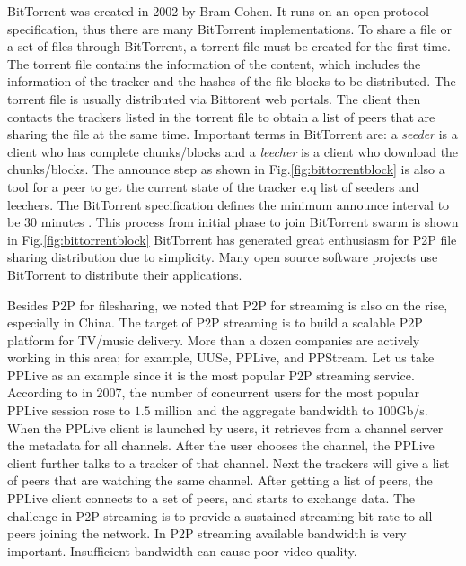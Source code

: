 BitTorrent was created in 2002 by Bram Cohen. 
It runs on an open protocol specification, thus there are many BitTorrent implementations.
To share a file or a set of files through BitTorrent, a torrent file must be created for the first time.  
The torrent file contains the information of the content, which includes the information of the tracker and the hashes of the file blocks to be distributed.
The torrent file is usually distributed via Bittorent web portals.
The client then contacts the trackers listed in the torrent file to obtain a list of peers that are sharing the file at the same time.  
Important terms in BitTorrent are: a \textit{seeder} is a client who has complete chunks/blocks and a \textit{leecher} is a client who download the chunks/blocks.
The announce step as shown in Fig.\ref{fig:bittorrentblock} is also a tool for a peer to get the current state of the tracker e.q list of seeders and leechers.
The BitTorrent specification defines the minimum announce interval to be 30 minutes \cite{torrentspec}.
This process from initial phase to join BitTorrent swarm is shown in Fig.\ref{fig:bittorrentblock}
BitTorrent has generated great enthusiasm for P2P file sharing distribution due to simplicity.  
Many open source software projects use BitTorrent to distribute their applications.

Besides P2P for filesharing, we  noted that P2P for streaming is also on the rise, especially in China.
The target of P2P streaming is to build a scalable P2P platform for TV/music delivery. 
More than a dozen companies are actively working in this area; for example, UUSe, PPLive, and PPStream.  
Let us take PPLive as an example since it is the most popular P2P streaming service.
According to \cite{4378423} in 2007, the number of concurrent users for the most popular PPLive session rose to $1.5$ million and the aggregate bandwidth to $100$Gb/s.
When the PPLive client is launched by users, it retrieves from a channel server the metadata for  all channels. 
After the user chooses the channel, the PPLive client further talks to a tracker of that channel. 
Next the trackers will give  a list of peers that are watching the same channel. 
After getting a list of peers, the PPLive client connects to a set of peers, and starts to exchange data. 
The challenge in P2P streaming is to provide a sustained streaming bit rate to all peers joining the network. 
In P2P streaming available bandwidth is very important.  
Insufficient bandwidth can cause poor video quality.  

